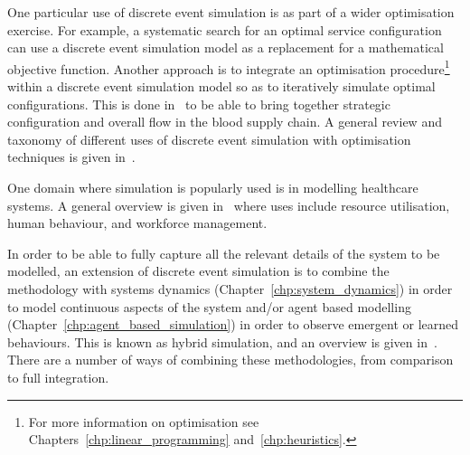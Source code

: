One particular use of discrete event simulation is as part of a wider
optimisation exercise. For example, a systematic search for an optimal service
configuration can use a discrete event simulation model as a replacement for a
mathematical objective function. Another approach is to integrate an
optimisation procedure\footnote{For more information on optimisation see
Chapters~\ref{chp:linear_programming} and~\ref{chp:heuristics}.} within a
discrete event simulation model so as to iteratively simulate optimal
configurations. This is done in~\cite{osorio2017simulation} to be able to
bring together strategic configuration and overall flow in the blood supply
chain. A general review and taxonomy of different uses of discrete event
simulation with optimisation techniques is given
in~\cite{figueira2014hybrid}.

One domain where simulation is popularly used is in modelling healthcare systems.
A general overview is given in~\cite{brailsford2009analysis} where uses
include resource utilisation, human behaviour, and workforce management.

In order to be able to fully capture all the relevant details of the system to
be modelled, an extension of discrete event simulation is to combine the
methodology with systems dynamics (Chapter~\ref{chp:system_dynamics}) in order
to model continuous aspects of the system and/or agent based modelling
(Chapter~\ref{chp:agent_based_simulation}) in order to observe emergent or
learned behaviours. This is known as hybrid simulation, and an overview is given
in~\cite{brailsford2019hybrid}. There are a number of ways of combining
these methodologies, from comparison to full integration.
